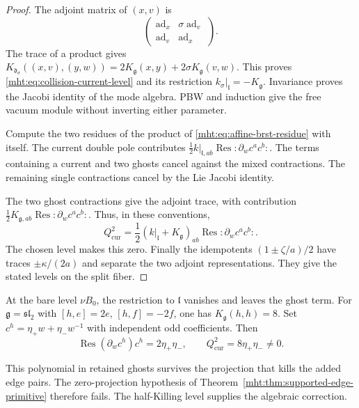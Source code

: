 \begin{proof}
The adjoint matrix of $(x,v)$ is
\[
 \begin{pmatrix}\operatorname{ad}_x&\sigma\operatorname{ad}_v\\
                 \operatorname{ad}_v&\operatorname{ad}_x\end{pmatrix}.
\]
The trace of a product gives
$K_{\mathfrak d_\sigma}((x,v),(y,w))
=2K_{\mathfrak g}(x,y)+2\sigma K_{\mathfrak g}(v,w)$.
This proves \eqref{mht:eq:collision-current-level} and its restriction
$k_\sigma|_{\mathfrak l}=-K_{\mathfrak g}$. Invariance proves the
Jacobi identity of the mode algebra. PBW and induction give the
free vacuum module without inverting either parameter.

Compute the two residues of the product of
\eqref{mht:eq:affine-brst-residue} with itself. The current double
pole contributes
$\tfrac12k|_{\mathfrak l,ab}\operatorname{Res}{:}\partial_wc^ac^b{:}$.
The terms containing a current and two ghosts cancel against the
mixed contractions. The remaining single contractions cancel by
the Lie Jacobi identity.

The two ghost contractions give the
adjoint trace, with contribution
$\tfrac12K_{\mathfrak g,ab}\operatorname{Res}{:}\partial_wc^ac^b{:}$.
Thus, in these conventions,
\begin{equation}\label{mht:eq:retained-brst-square}
 Q_{\mathrm{cur}}^2=\frac12
       (k|_{\mathfrak l}+K_{\mathfrak g})_{ab}
                     \operatorname{Res}{:}\partial_wc^ac^b{:}.
\end{equation}
The chosen level makes this zero.
Finally the idempotents $(1\pm\zeta/a)/2$ have traces
$\pm\kappa/(2a)$ and separate the two adjoint representations.
They give the stated levels on the split fiber.
\end{proof}

At the bare level $\nu B_0$, the restriction to $\mathfrak l$
vanishes and leaves the ghost term. For $\mathfrak g=\mathfrak{sl}_2$
with $[h,e]=2e$, $[h,f]=-2f$, one has $K_{\mathfrak g}(h,h)=8$.
Set $c^h=\eta_+w+\eta_-w^{-1}$ with independent odd coefficients.
Then
\[
 \operatorname{Res}(\partial_wc^h)c^h=2\eta_+\eta_-,\qquad
 Q_{\mathrm{cur}}^2=8\eta_+\eta_-\ne0.
\]

This polynomial in retained ghosts survives the projection that
kills the added edge pairs. The zero-projection hypothesis of
Theorem~\ref{mht:thm:supported-edge-primitive} therefore fails.
The half-Killing level supplies the algebraic correction.

